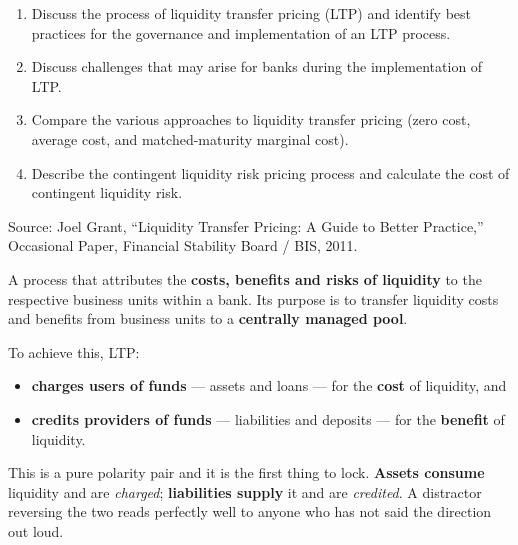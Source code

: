 
\begin{lrkeybox}
\begin{enumerate}[label=\textbf{\alph*.}]
\item Discuss the process of liquidity transfer pricing (LTP) and identify best practices for the governance and implementation of an LTP process.
\item Discuss challenges that may arise for banks during the implementation of LTP.
\item Compare the various approaches to liquidity transfer pricing (zero cost, average cost, and matched-maturity marginal cost).
\item Describe the contingent liquidity risk pricing process and calculate the cost of contingent liquidity risk.
\end{enumerate}
{\footnotesize\color{FRMGrey}Source: Joel Grant, ``Liquidity Transfer Pricing: A Guide to Better Practice,'' Occasional Paper, Financial Stability Board / BIS, 2011.}
\end{lrkeybox}


\begin{lrdefbox}
A process that attributes the \textbf{costs, benefits and risks of liquidity} to the respective business units within a bank. Its purpose is to transfer liquidity costs and benefits from business units to a \textbf{centrally managed pool}.
\end{lrdefbox}

\begin{lrkeybox}
To achieve this, LTP:
\begin{itemize}
\item \textbf{charges users of funds} --- assets and loans --- for the \textbf{cost} of liquidity, and
\item \textbf{credits providers of funds} --- liabilities and deposits --- for the \textbf{benefit} of liquidity.
\end{itemize}
\end{lrkeybox}

\begin{lrtrapbox}
This is a pure polarity pair and it is the first thing to lock. \textbf{Assets consume} liquidity and are \emph{charged}; \textbf{liabilities supply} it and are \emph{credited}. A distractor reversing the two reads perfectly well to anyone who has not said the direction out loud.
\end{lrtrapbox}

